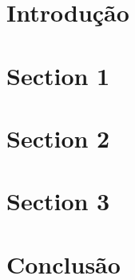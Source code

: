 \documentclass[a4paper,11pt]{article}
\begin{document}

\newpage
\tableofcontents
\thispagestyle{empty}

\newpage
\section{Introdução}

\section{Section 1}

\section{Section 2}

\section{Section 3}

\section{Conclusão}

\newpage
\nocite{Allen} \nocite{ams}



\renewcommand\refname{Referências}
%

\thispagestyle{empty}

\thispagestyle{empty}
\end{document}
